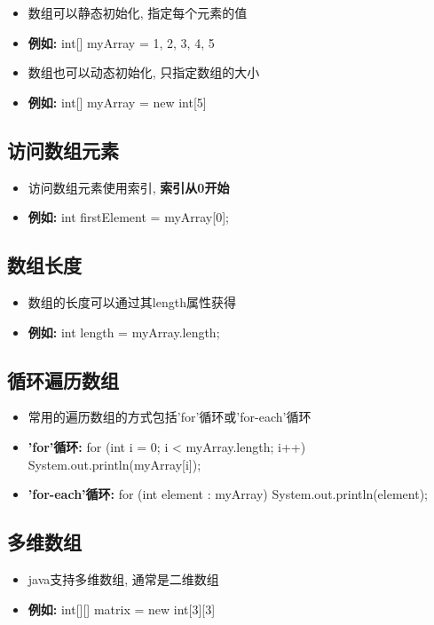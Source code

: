 \documentclass{article}
\begin{document}
\begin{itemize}
    \item 数组可以静态初始化, 指定每个元素的值
    \item \textbf{例如: } int[] myArray = {1, 2, 3, 4, 5}
    \item 数组也可以动态初始化, 只指定数组的大小
    \item \textbf{例如:} int[] myArray = new int[5]
\end{itemize}

\subsection{ 访问数组元素}
\begin{itemize}
    \item 访问数组元素使用索引, \textbf{索引从0开始}
    \item \textbf{例如:} int firstElement = myArray[0];
\end{itemize}
\subsection{ 数组长度}
\begin{itemize}
    \item 数组的长度可以通过其length属性获得
    \item \textbf{例如:} int length = myArray.length;
\end{itemize}
\subsection{ 循环遍历数组}
\begin{itemize}
    \item 常用的遍历数组的方式包括'for'循环或'for-each'循环
    \item \textbf{'for'循环:} for (int i = 0; i < myArray.length; i++){
    System.out.println(myArray[i]);
    }
    \item \textbf{'for-each'循环:} for (int element : myArray){
    System.out.println(element);
    }
\end{itemize}
\subsection{ 多维数组}
\begin{itemize}
    \item java支持多维数组, 通常是二维数组
    \item \textbf{例如:} int[][] matrix = new int[3][3]
\end{itemize}
\end{document}
